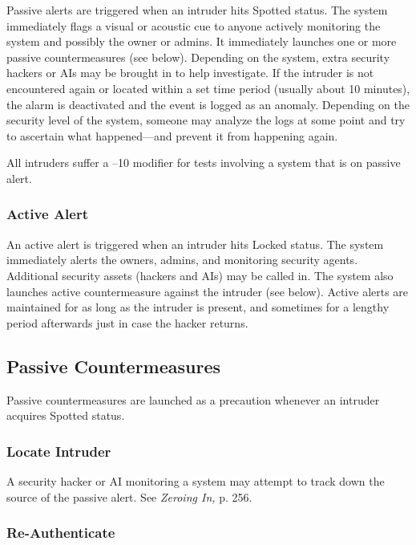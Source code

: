 Passive alerts are triggered when an intruder hits Spotted
status. The system immediately flags a visual or
acoustic cue to anyone actively monitoring the system 
and possibly the owner or admins. It immediately 
launches one or more passive countermeasures (see 
below). Depending on the system, extra security hackers
or AIs may be brought in to help investigate. If the
intruder is not encountered again or located within a 
set time period (usually about 10 minutes), the alarm 
is deactivated and the event is logged as an anomaly. 
Depending on the security level of the system, someone
may analyze the logs at some point and try to
ascertain what happened—and prevent it from happening
again.

All intruders suffer a –10 modifier for tests involving
a system that is on passive alert.

\subsubsection{Active Alert}

An active alert is triggered when an intruder hits 
Locked status. The system immediately alerts the 
owners, admins, and monitoring security agents. 
Additional security assets (hackers and AIs) may be 
called in. The system also launches active countermeasure
against the intruder (see below). Active alerts are
maintained for as long as the intruder is present, and 
sometimes for a lengthy period afterwards just in case 
the hacker returns.

\subsection{Passive Countermeasures}

Passive countermeasures are launched as a precaution 
whenever an intruder acquires Spotted status.

\subsubsection{Locate Intruder}

A security hacker or AI monitoring a system may attempt
to track down the source of the passive alert.
See \textit{Zeroing In,} p. 256.

\subsubsection{Re-Authenticate}

